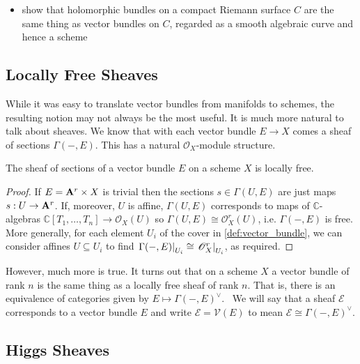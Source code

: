 \documentclass[12pt]{ociamthesis}  %
\begin{document}
\begin{itemize}
  \item show that holomorphic bundles on a compact Riemann surface $C$
        are the same thing as vector bundles on $C$, regarded as a smooth algebraic curve and hence a scheme
\end{itemize}

\missingsection

\subsection{Locally Free Sheaves}\label{sec:locally_free_sheaves}

While it was easy to translate vector bundles from manifolds
to schemes, the resulting notion may not always be the most
useful. It is much more natural to talk about sheaves. We know
that with each vector bundle $E\to X$ comes a sheaf of sections
$\Gamma(-,E)$. This has a natural $\mathscr O_X$-module structure.

\begin{lemma}
  The sheaf of sections of a vector bundle $E$ on a scheme $X$ is
  locally free.
  \begin{proof}
    If $E=\mathbf{A}^{r}_{}\times X$ is
    trivial then the sections $s\in\Gamma(U,E)$ are just maps
    $s:U\to \mathbf{A}^{r}_{}$. If, moreover, $U$ is affine,
    $\Gamma(U,E)$ corresponds to maps of
    $\mathbb{C}$-algebras
    $\mathbb{C}[T_1,\ldots,T_n]\to\mathscr O_X(U)$ so
    $\Gamma(U,E)\cong \mathscr O^r_X(U)$, i.e. $\Gamma(-,E)$
    is free.
    More generally, for each element $U_i$ of the cover in
    \ref{def:vector_bundle}, we can consider affines $U\subseteq U_i$
    to find $\left.{\Gamma(-,E)}\right\vert_{U_i}\cong \left.{\mathscr O_X^r}\right\vert_{U_i}$,
    as required.
  \end{proof}
\end{lemma}

However, much more is true. It turns out that on a scheme $X$
a vector bundle of rank $n$ is the same thing as a locally
free sheaf of rank $n$. That is, there is an equivalence
of categories given by $E \mapsto \Gamma(-,E)^\vee$.~\cite[128-129]{hartshorne1977}
We will say that a sheaf $\mathscr E$ corresponds to a vector bundle
$E$ and write $\mathscr E=\mathcal V(E)$ to mean
$\mathscr E\cong\Gamma(-,E)^\vee$.

\subsection{Higgs Sheaves}
\end{document}
